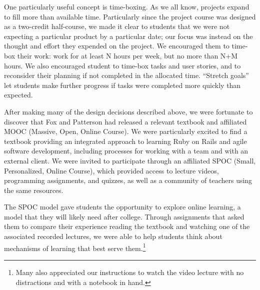 One particularly useful concept is time-boxing.
As we all know, projects expand to fill more than available time.
Particularly since the project course was designed as a two-credit 
half-course, we made it clear to students that we were not expecting
a particular product by a particular date; our focus was instead on the
thought and effort they expended on the project.  We encouraged them
to time-box their work: work for at least N hours per week, but no more
than N+M hours.  We also encouraged student to time-box tasks 
and user stories, and to reconsider their planning if not completed in the 
allocated time.  ``Stretch goals'' let students make further progress 
if tasks were completed more quickly than expected.

After making many of the design decisions described above, we were
fortunate to discover that Fox and Patterson had released a relevant
textbook \cite{saasbook} and affiliated MOOC (Massive, Open, Online
Course).  
We were particularly excited to find a textbook providing an integrated
approach to learning Ruby on Rails and agile software development, 
including processes for working with a team and with an external client.
We were invited to participate through an affiliated SPOC
(Small, Personalized, Online Course), which provided access to lecture 
videos, programming assignments, and quizzes, 
as well as a community of teachers using the same resources.

The SPOC model gave students the
opportunity to explore online learning, a model
that they will likely need after college.  Through
assignments that asked them to compare their experience reading the
textbook and watching one of the associated recorded lectures, we
were able to help students think about mechanisms of learning that
best serve them.\footnote{Many also appreciated our instructions
to watch the video lecture with no distractions and with a notebook
in hand.} 
